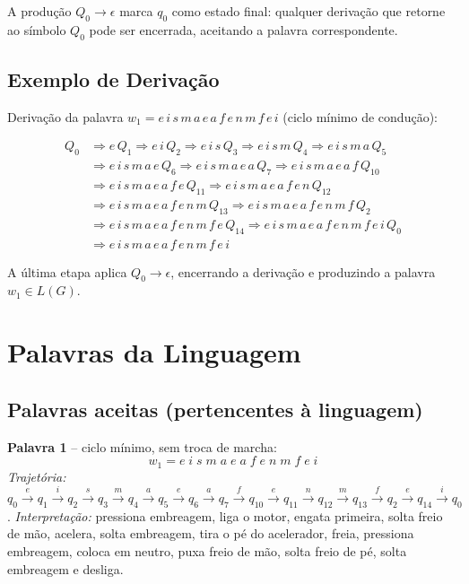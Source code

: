 \documentclass[12pt,a4paper]{article}
\begin{document}
A produção $Q_0 \to \epsilon$ marca $q_0$ como estado final: qualquer derivação que retorne ao símbolo $Q_0$ pode ser encerrada, aceitando a palavra correspondente.

\subsection{Exemplo de Derivação}

Derivação da palavra $w_1 = e\,i\,s\,m\,a\,e\,a\,f\,e\,n\,m\,f\,e\,i$ (ciclo mínimo de condução):

\begin{align*}
Q_0 &\Rightarrow e\,Q_1 \Rightarrow e\,i\,Q_2 \Rightarrow e\,i\,s\,Q_3 \Rightarrow e\,i\,s\,m\,Q_4 \Rightarrow e\,i\,s\,m\,a\,Q_5 \\
    &\Rightarrow e\,i\,s\,m\,a\,e\,Q_6 \Rightarrow e\,i\,s\,m\,a\,e\,a\,Q_7 \Rightarrow e\,i\,s\,m\,a\,e\,a\,f\,Q_{10} \\
    &\Rightarrow e\,i\,s\,m\,a\,e\,a\,f\,e\,Q_{11} \Rightarrow e\,i\,s\,m\,a\,e\,a\,f\,e\,n\,Q_{12} \\
    &\Rightarrow e\,i\,s\,m\,a\,e\,a\,f\,e\,n\,m\,Q_{13} \Rightarrow e\,i\,s\,m\,a\,e\,a\,f\,e\,n\,m\,f\,Q_2 \\
    &\Rightarrow e\,i\,s\,m\,a\,e\,a\,f\,e\,n\,m\,f\,e\,Q_{14} \Rightarrow e\,i\,s\,m\,a\,e\,a\,f\,e\,n\,m\,f\,e\,i\,Q_0 \\
    &\Rightarrow e\,i\,s\,m\,a\,e\,a\,f\,e\,n\,m\,f\,e\,i
\end{align*}

A última etapa aplica $Q_0 \to \epsilon$, encerrando a derivação e produzindo a palavra $w_1 \in L(G)$.

\section{Palavras da Linguagem}

\subsection{Palavras aceitas (pertencentes à linguagem)}

\textbf{Palavra 1} -- ciclo mínimo, sem troca de marcha:
\[
w_1 = e\;i\;s\;m\;a\;e\;a\;f\;e\;n\;m\;f\;e\;i
\]
\textit{Trajetória:} $q_0 \xrightarrow{e} q_1 \xrightarrow{i} q_2 \xrightarrow{s} q_3 \xrightarrow{m} q_4 \xrightarrow{a} q_5 \xrightarrow{e} q_6 \xrightarrow{a} q_7 \xrightarrow{f} q_{10} \xrightarrow{e} q_{11} \xrightarrow{n} q_{12} \xrightarrow{m} q_{13} \xrightarrow{f} q_2 \xrightarrow{e} q_{14} \xrightarrow{i} q_0$.
\emph{Interpretação:} pressiona embreagem, liga o motor, engata primeira, solta freio de mão, acelera, solta embreagem, tira o pé do acelerador, freia, pressiona embreagem, coloca em neutro, puxa freio de mão, solta freio de pé, solta embreagem e desliga.
\end{document}
